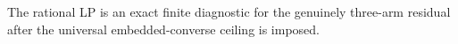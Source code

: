 The rational LP is an exact finite diagnostic for the genuinely three-arm residual after the universal embedded-converse ceiling is imposed.
